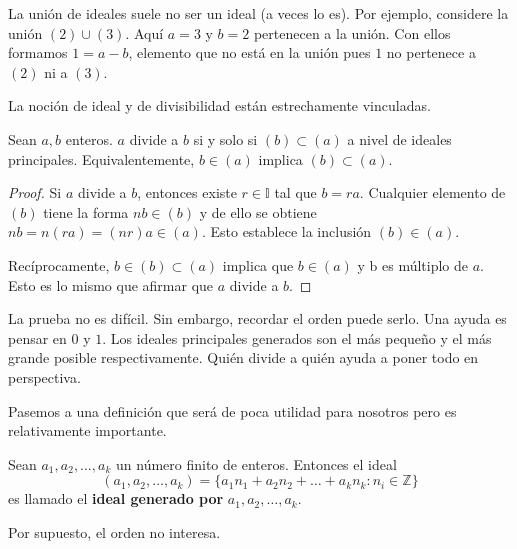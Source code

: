 \documentclass[main.tex]{subfiles}
\begin{document}
\begin{example}
    La uni\'on de ideales suele no ser un ideal (a veces lo es). Por ejemplo, considere la uni\'on $(2) \cup (3)$. Aqu\'i $a = 3$ y $b = 2$ pertenecen a la uni\'on. Con ellos formamos $1 = a - b$, elemento que no est\'a en la uni\'on pues $1$ no pertenece a $(2)$ ni a $(3)$.
\end{example}

La noci\'on de ideal y de divisibilidad est\'an estrechamente vinculadas.

\begin{proposition}
    Sean $a, b$ enteros. $a$ divide a $b$ si y solo si $(b) \subset (a)$ a nivel de ideales principales.
    Equivalentemente, $b \in (a)$ implica $(b) \subset (a)$.
\end{proposition}

\begin{proof}
    Si $a$ divide a $b$, entonces existe $r \in \mathbb I$ tal que $b = ra$. Cualquier elemento de $(b)$ tiene la forma $nb \in (b)$ y de ello se obtiene $nb = n(ra) = (nr)a \in (a)$. Esto establece la inclusi\'on $(b) \in (a)$.
    
    Rec\'iprocamente, $b \in (b) \subset (a)$ implica que $b \in (a)$ y b es m\'ultiplo de $a$. Esto es lo mismo que afirmar que $a$ divide a $b$.
\end{proof}

\begin{note}
    La prueba no es dif\'icil. Sin embargo, recordar el orden puede serlo. Una ayuda es pensar en $0$ y $1$. Los ideales principales generados son el m\'as pequeño y el m\'as grande posible respectivamente. Qui\'en divide a qui\'en ayuda a poner todo en perspectiva.
\end{note}

Pasemos a una definici\'on que ser\'a de poca utilidad para nosotros pero es relativamente importante.

\begin{defn}
    Sean $a_1, a_2, \dots, a_k$ un n\'umero finito de enteros. Entonces el ideal
    $$(a_1, a_2, \dots, a_k) = \{a_1 n_1 + a_2 n_2 + \dots + a_k n_k : n_i \in \mathbb Z\}$$
    es llamado el {\bf ideal generado por} $a_1, a_2, \dots, a_k$.
\end{defn}

\begin{note}
    Por supuesto, el orden no interesa.
\end{note}
\end{document}
